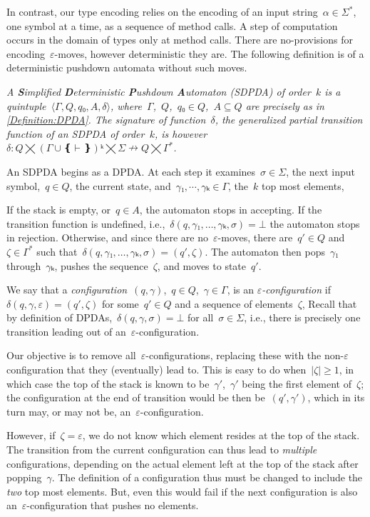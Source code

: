 In contrast, our type encoding relies on the encoding of an input string~$α∈Σ^*$, one symbol at a time, as a sequence of method calls.
A step of computation occurs in the domain of \Java types only at method calls. There are no-provisions for encoding~$ε$-moves, however deterministic
  they are.
The following definition is of a deterministic pushdown automata without such moves.

\begin{Definition}
  \label{Definition:SDPDA}
  \slshape
  A \emph{\textbf Simplified \textbf Deterministic \textbf Pushdown \textbf Automaton} (SDPDA) of order~$k$ is
    a quintuple~$⟨Γ,Q,q₀,A,δ⟩$,
  where~$Γ$,~$Q$,~$q₀∈Q$,~$A⊆Q$ are precisely as in \cref{Definition:DPDA}.
  The signature of function~$δ$, the \emph{generalized partial transition function}
  of an SDPDA of order~$k$, is however~$δ: Q⨉\left(Γ∪❴\vdash❵\right)ᵏ⨉Σ↛Q⨉Γ^*$.
  \par
  An SDPDA begins as a DPDA\@. At each step it examines~$σ∈Σ$,
    the next input symbol,~$q∈Q$, the current state,
    and~$γ₁,⋯,γₖ∈Γ$, the~$k$ top most elements,
  \par
  If the stack is empty, or~$q∈A$, the automaton stops in accepting.
  If the transition function is undefined, i.e.,~$δ(q,γ₁,…,γₖ,σ)=⊥$ the automaton
    stops in rejection.
  Otherwise, and since there are no~$ε$-moves, there are~$q'∈Q$ and~$ζ∈Γ^*$
    such that~$δ(q,γ₁,…,γₖ,σ)=(q',ζ)$.
  The automaton then pops~$γ₁$ through~$γₖ$, pushes the sequence~$ζ$, and
    moves to state~$q'$.
\end{Definition}

We say that
a \emph{configuration}~$(q,γ)$,~$q∈Q$,~$γ∈Γ$,
  is an \emph{$ε$-configuration} if~$δ(q,γ,ε)=(q',ζ)$ for
    some~$q'∈Q$ and a sequence of elements~$ζ$,
Recall that by definition of DPDAs,~$δ(q,γ,σ)=⊥$ for
  all~$σ∈Σ$, i.e., there is precisely one transition
  leading out of an~$ε$-configuration.

Our objective is to remove all~$ε$-configurations,
  replacing these with the non-$ε$ configuration that
  they (eventually) lead to.
This is easy to do when~$|ζ|≥1$, in which
  case the top of the stack is known to be~$γ'$,~$γ'$ being the first
    element of~$ζ$; the configuration at the end of transition
    would be then be~$(q',γ')$, which in its turn may, or may not be,
    an~$ε$-configuration.

However, if~$ζ=ε$, we do not know which element resides at the top
  of the stack.
The transition from the current configuration can thus lead to \emph{multiple} configurations,
  depending on the actual element left at the top of the stack after popping~$γ$.
The definition of a configuration thus must be changed to include the \emph{two} top
  most elements.
But, even this would fail if the next configuration is also an~$ε$-configuration that pushes no elements.

